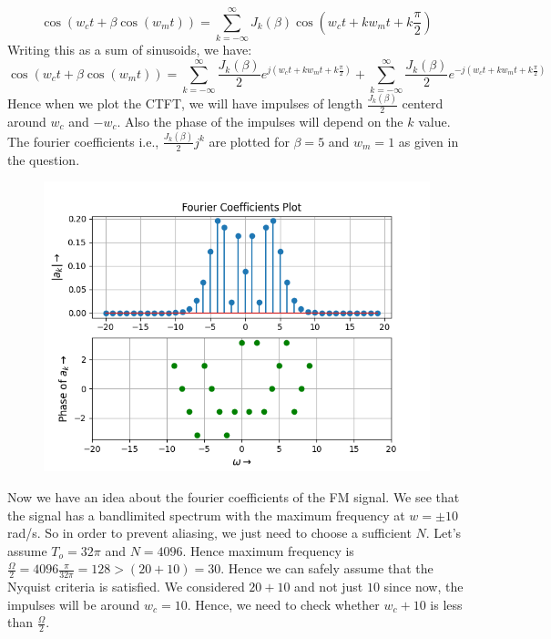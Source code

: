 \documentclass[12pt, a4paper]{article}
\begin{document}
\begin{equation*}
    \cos(w_{c}t + \beta \cos(w_{m}t)) = \sum_{k=-\infty}^{\infty}J_{k}(\beta)\cos(w_{c}t+kw_{m}t+k\frac{\pi}{2})
\end{equation*}
Writing this as a sum of sinusoids, we have:
\begin{equation*}
    \cos(w_{c}t + \beta \cos(w_{m}t)) = \sum_{k=-\infty}^{\infty}\frac{J_{k}(\beta)}{2}e^{j(w_{c}t+kw_{m}t+k\frac{\pi}{2})} + \sum_{k=-\infty}^{\infty}\frac{J_{k}(\beta)}{2}e^{-j(w_{c}t+kw_{m}t+k\frac{\pi}{2})}
\end{equation*}
Hence when we plot the CTFT, we will have impulses of length $\frac{J_{k}(\beta)}{2}$ centerd around $w_{c}$ and $-w_{c}$. Also the phase of the impulses will depend on the $k$ value. The fourier coefficients i.e., $\frac{J_{k}(\beta)}{2}j^{k}$ are plotted for $\beta=5$ and $w_{m}=1$ as given in the question.
\vspace*{-0.5cm}
\begin{figure}[H]
    \centering
    \includegraphics[scale = 0.8]{Figure_7.png}
    \label{fig:sample}
\end{figure}
Now we have an idea about the fourier coefficients of the FM signal. We see that the signal has a bandlimited spectrum with the maximum frequency at $w = \pm 10$ rad/s. So in order to prevent aliasing, we just need to choose a sufficient $N$. Let's assume $T_{o}=32\pi$ and $N=4096$. Hence maximum frequency is $\frac{\Omega}{2}=4096\frac{\pi}{32\pi} = 128 > (20+10) = 30$. Hence we can safely assume that the Nyquist criteria is satisfied. We considered $20 + 10$ and not just $10$ since now, the impulses will be around $w_{c}=10$. Hence, we need to check whether $w_{c}+10$ is less than $\frac{\Omega}{2}$.
\end{document}
